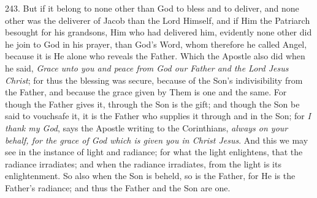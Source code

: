 243. But if
it belong to none other than God to bless and to deliver, and none
other was the deliverer of Jacob than the Lord Himself, and if Him the
Patriarch besought for his grandsons, Him who had delivered him,
evidently none other did he join to God in his prayer, than God's
Word, whom therefore he called Angel, because it is He alone who
reveals the Father. Which the Apostle also did when he said, \emph{Grace
unto you and peace from God our Father and the Lord Jesus Christ};
for thus the blessing was secure, because of the Son's indivisibility
from the Father, and because the grace given by Them is one and the
same. For though the Father gives it, through the Son is the gift; and
though the Son be said to vouchsafe it, it is the Father who supplies
it through and in the Son; for \emph{I thank my God}, says the Apostle
writing to the Corinthians, \emph{always on your behalf, for the grace of
God which is given you in Christ Jesus}. And this we may see in the
instance of light and radiance; for what the light enlightens, that
the radiance irradiates; and when the radiance irradiates, from the
light is its enlightenment. So also when the Son is beheld, so is the
Father, for He is the Father's radiance; and thus the Father and the
Son are one.

